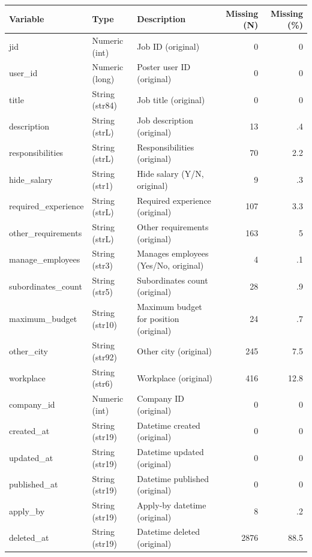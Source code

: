 \begin{threeparttable}


\begin{tabular}{@{}lllrr@{}}


\toprule


\textbf{Variable} & \textbf{Type} & \textbf{Description} & \textbf{Missing (N)} & \textbf{Missing (\%)} \\


\midrule


\midrule
jid & Numeric (int) & Job ID (original)&           0&           0\\
user\_id & Numeric (long) & Poster user ID (original)&           0&           0\\
title & String (str84) & Job title (original)&           0&           0\\
description & String (strL) & Job description (original)&          13&          .4\\
responsibilities & String (strL) & Responsibilities (original)&          70&         2.2\\
hide\_salary & String (str1) & Hide salary (Y/N, original)&           9&          .3\\
required\_experience & String (strL) & Required experience (original)&         107&         3.3\\
other\_requirements & String (strL) & Other requirements (original)&         163&           5\\
manage\_employees & String (str3) & Manages employees (Yes/No, original)&           4&          .1\\
subordinates\_count & String (str5) & Subordinates count (original)&          28&          .9\\
maximum\_budget & String (str10) & Maximum budget for position (original)&          24&          .7\\
other\_city & String (str92) & Other city (original)&         245&         7.5\\
workplace & String (str6) & Workplace (original)&         416&        12.8\\
company\_id & Numeric (int) & Company ID (original)&           0&           0\\
created\_at & String (str19) & Datetime created (original)&           0&           0\\
updated\_at & String (str19) & Datetime updated (original)&           0&           0\\
published\_at & String (str19) & Datetime published (original)&           0&           0\\
apply\_by & String (str19) & Apply-by datetime (original)&           8&          .2\\
deleted\_at & String (str19) & Datetime deleted (original)&        2876&        88.5\\
\bottomrule


\end{tabular}


\end{threeparttable}
